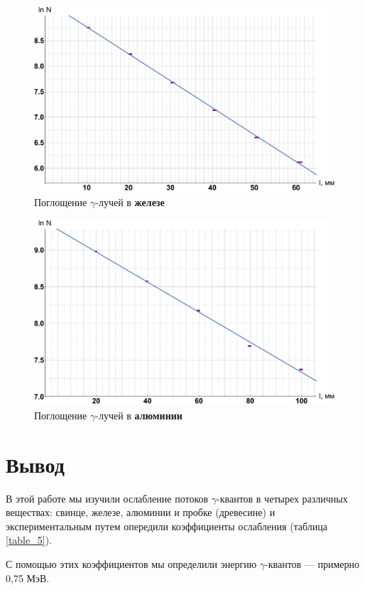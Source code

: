 \documentclass[12pt]{kiarticle}
\newcommand{\ga}{\ensuremath{\gamma}}
\begin{document}
\begin{figure}[h!]
	\label{graf_fe}
	\includegraphics[scale=0.47]{fe.pdf}
	\caption{Поглощение \ga-лучей в \textbf{железе}}
\end{figure}

\begin{figure}[h!]
	\label{graf_al}
	\includegraphics[scale=0.47]{al.pdf}
	\caption{Поглощение \ga-лучей в \textbf{алюминии}}
\end{figure}

\section{Вывод}

В этой работе мы изучили ослабление потоков \ga-квантов в четырех различных веществах: свинце, железе, алюминии и пробке (древесине) и экспериментальным путем опередили коэффициенты ослабления (таблица \ref{table_5}). 

С помощью этих коэффициентов мы определили энергию \ga-квантов --- примерно 0,75 МэВ.
\end{document}
